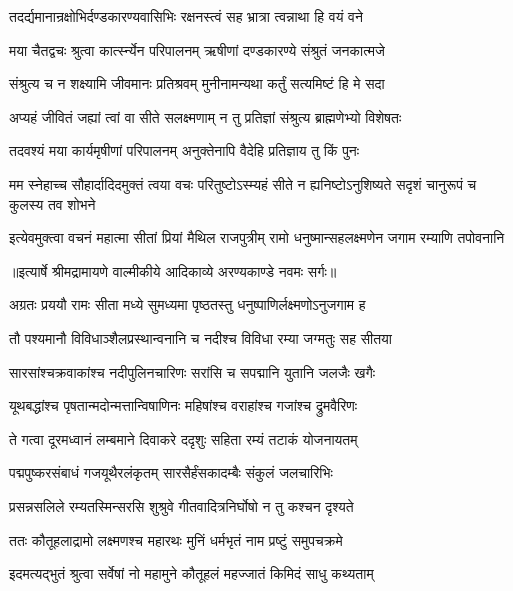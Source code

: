 \twolineshloka
{तदर्द्यमानान्रक्षोभिर्दण्डकारण्यवासिभिः}
{रक्षनस्त्वं सह भ्रात्रा त्वन्नाथा हि वयं वने} %

\twolineshloka
{मया चैतद्वचः श्रुत्वा कार्त्स्न्येन परिपालनम्}
{ऋषीणां दण्डकारण्ये संश्रुतं जनकात्मजे} %

\twolineshloka
{संश्रुत्य च न शक्ष्यामि जीवमानः प्रतिश्रवम्}
{मुनीनामन्यथा कर्तुं सत्यमिष्टं हि मे सदा} %

\twolineshloka
{अप्यहं जीवितं जह्यां त्वां वा सीते सलक्ष्मणाम्}
{न तु प्रतिज्ञां संश्रुत्य ब्राह्मणेभ्यो विशेषतः} %

\twolineshloka
{तदवश्यं मया कार्यमृषीणां परिपालनम्}
{अनुक्तेनापि वैदेहि प्रतिज्ञाय तु किं पुनः} %

\threelineshloka
{मम स्नेहाच्च सौहार्दादिदमुक्तं त्वया वचः}
{परितुष्टोऽस्म्यहं सीते न ह्यनिष्टोऽनुशिष्यते}
{सदृशं चानुरूपं च कुलस्य तव शोभने} %

\fourlineindentedshloka
{इत्येवमुक्त्वा वचनं महात्मा}
{ सीतां प्रियां मैथिल राजपुत्रीम्}
{रामो धनुष्मान्सहलक्ष्मणेन}
{ जगाम रम्याणि तपोवनानि} %


{॥इत्यार्षे श्रीमद्रामायणे वाल्मीकीये आदिकाव्ये अरण्यकाण्डे नवमः सर्गः॥}


\twolineshloka
{अग्रतः प्रययौ रामः सीता मध्ये सुमध्यमा}
{पृष्ठतस्तु धनुष्पाणिर्लक्ष्मणोऽनुजगाम ह} %

\twolineshloka
{तौ पश्यमानौ विविधाञ्शैलप्रस्थान्वनानि च}
{नदीश्च विविधा रम्या जग्मतुः सह सीतया} %

\twolineshloka
{सारसांश्चक्रवाकांश्च नदीपुलिनचारिणः}
{सरांसि च सपद्मानि युतानि जलजैः खगैः} %

\twolineshloka
{यूथबद्धांश्च पृषतान्मदोन्मत्तान्विषाणिनः}
{महिषांश्च वराहांश्च गजांश्च द्रुमवैरिणः} %

\twolineshloka
{ते गत्वा दूरमध्वानं लम्बमाने दिवाकरे}
{ददृशुः सहिता रम्यं तटाकं योजनायतम्} %

\twolineshloka
{पद्मपुष्करसंबाधं गजयूथैरलंकृतम्}
{सारसैर्हंसकादम्बैः संकुलं जलचारिभिः} %

\twolineshloka
{प्रसन्नसलिले रम्यतस्मिन्सरसि शुश्रुवे}
{गीतवादित्रनिर्घोषो न तु कश्चन दृश्यते} %

\twolineshloka
{ततः कौतूहलाद्रामो लक्ष्मणश्च महारथः}
{मुनिं धर्मभृतं नाम प्रष्टुं समुपचक्रमे} %

\twolineshloka
{इदमत्यद्भुतं श्रुत्वा सर्वेषां नो महामुने}
{कौतूहलं महज्जातं किमिदं साधु कथ्यताम्} %

